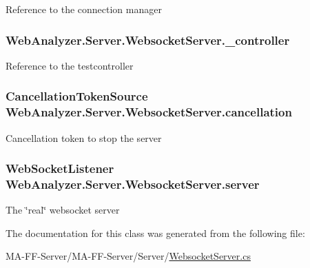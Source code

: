 Reference to the connection manager 

\hypertarget{class_web_analyzer_1_1_server_1_1_websocket_server_ae9083f25b4a1b713998b19eb68e35d6e}{}
\subsubsection[{\+\_\+controller}]{ Web\+Analyzer.\+Server.\+Websocket\+Server.\+\_\+controller\hspace{0.3cm}{\ttfamily [private]}}\label{class_web_analyzer_1_1_server_1_1_websocket_server_ae9083f25b4a1b713998b19eb68e35d6e}


Reference to the testcontroller 

\hypertarget{class_web_analyzer_1_1_server_1_1_websocket_server_ac6ff75e9f3bc2200953d755b029e5344}{}
\subsubsection[{cancellation}]{\setlength{\rightskip}{0pt plus 5cm}Cancellation\+Token\+Source Web\+Analyzer.\+Server.\+Websocket\+Server.\+cancellation\hspace{0.3cm}{\ttfamily [private]}}\label{class_web_analyzer_1_1_server_1_1_websocket_server_ac6ff75e9f3bc2200953d755b029e5344}


Cancellation token to stop the server 

\hypertarget{class_web_analyzer_1_1_server_1_1_websocket_server_abc42c992699d787cfdcb33f9e51140b4}{}
\subsubsection[{server}]{\setlength{\rightskip}{0pt plus 5cm}Web\+Socket\+Listener Web\+Analyzer.\+Server.\+Websocket\+Server.\+server\hspace{0.3cm}{\ttfamily [private]}}\label{class_web_analyzer_1_1_server_1_1_websocket_server_abc42c992699d787cfdcb33f9e51140b4}


The \char`\"{}real\char`\"{} websocket server 



The documentation for this class was generated from the following file\+:\begin{DoxyCompactItemize}
\item 
M\+A-\/\+F\+F-\/\+Server/\+M\+A-\/\+F\+F-\/\+Server/\+Server/\hyperlink{_websocket_server_8cs}{Websocket\+Server.\+cs}\end{DoxyCompactItemize}
